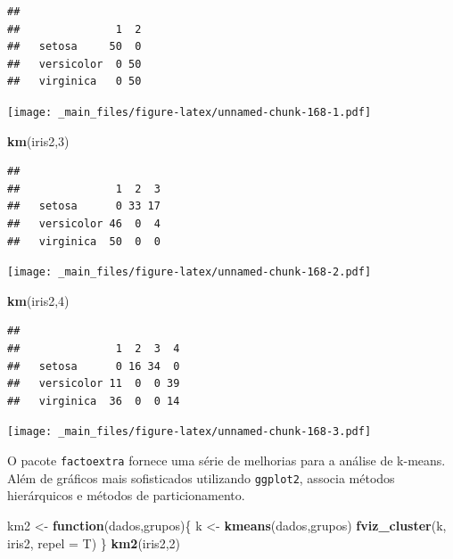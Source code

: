 \documentclass[
]{book}
\newenvironment{Shaded}{\begin{snugshade}}{\end{snugshade}}
\newcommand{\ControlFlowTok}[1]{\textcolor[rgb]{0.13,0.29,0.53}{\textbf{#1}}}
\newcommand{\DataTypeTok}[1]{\textcolor[rgb]{0.13,0.29,0.53}{#1}}
\newcommand{\DecValTok}[1]{\textcolor[rgb]{0.00,0.00,0.81}{#1}}
\newcommand{\KeywordTok}[1]{\textcolor[rgb]{0.13,0.29,0.53}{\textbf{#1}}}
\newcommand{\NormalTok}[1]{#1}
\newcommand{\StringTok}[1]{\textcolor[rgb]{0.31,0.60,0.02}{#1}}
\theoremstyle{definition}
\theoremstyle{definition}
\theoremstyle{definition}
\theoremstyle{remark}
\begin{document}
\begin{verbatim}
##             
##               1  2
##   setosa     50  0
##   versicolor  0 50
##   virginica   0 50
\end{verbatim}

\texttt{[image: \_main\_files/figure-latex/unnamed-chunk-168-1.pdf]}

\begin{Shaded}
\begin{Highlighting}[]
\KeywordTok{km}\NormalTok{(iris2,}\DecValTok{3}\NormalTok{)}
\end{Highlighting}
\end{Shaded}

\begin{verbatim}
##             
##               1  2  3
##   setosa      0 33 17
##   versicolor 46  0  4
##   virginica  50  0  0
\end{verbatim}

\texttt{[image: \_main\_files/figure-latex/unnamed-chunk-168-2.pdf]}

\begin{Shaded}
\begin{Highlighting}[]
\KeywordTok{km}\NormalTok{(iris2,}\DecValTok{4}\NormalTok{)}
\end{Highlighting}
\end{Shaded}

\begin{verbatim}
##             
##               1  2  3  4
##   setosa      0 16 34  0
##   versicolor 11  0  0 39
##   virginica  36  0  0 14
\end{verbatim}

\texttt{[image: \_main\_files/figure-latex/unnamed-chunk-168-3.pdf]}

O pacote \texttt{factoextra} fornece uma série de melhorias para a análise de k-means. Além de gráficos mais sofisticados utilizando \texttt{ggplot2}, associa métodos hierárquicos e métodos de particionamento.

\begin{Shaded}
\begin{Highlighting}[]
\NormalTok{km2 \textless{}{-}}\StringTok{ }\ControlFlowTok{function}\NormalTok{(dados,grupos)\{}
\NormalTok{  k \textless{}{-}}\StringTok{ }\KeywordTok{kmeans}\NormalTok{(dados,grupos)}
  \KeywordTok{fviz\_cluster}\NormalTok{(k, iris2, }\DataTypeTok{repel =}\NormalTok{ T)}
\NormalTok{\}}
\KeywordTok{km2}\NormalTok{(iris2,}\DecValTok{2}\NormalTok{)}
\end{Highlighting}
\end{Shaded}
\end{document}
